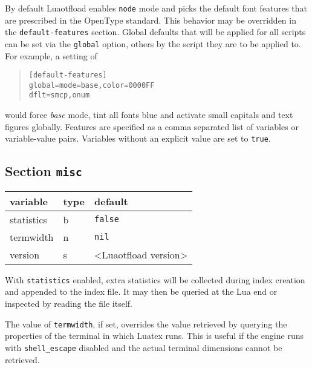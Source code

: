 \documentclass[a4paper]{article}
\newlength{\DUtablewidth} %
\begin{document}
By default Luaotfload enables \texttt{node} mode and picks the default font
features that are prescribed in the OpenType standard. This behavior
may be overridden in the \texttt{default-features} section. Global defaults
that will be applied for all scripts can be set via the \texttt{global}
option, others by the script they are to be applied to. For example,
a setting of

\begin{quote}
\begin{alltt}
[default-features]
    global = mode=base,color=0000FF
    dflt   = smcp,onum
\end{alltt}
\end{quote}

would force \emph{base} mode, tint all fonts blue and activate small
capitals and text figures globally. Features are specified as a comma
separated list of variables or variable-value pairs. Variables without
an explicit value are set to \texttt{true}.


\subsection{Section \texttt{misc}%
  \label{section-misc}%
}

\setlength{\DUtablewidth}{\linewidth}
\begin{longtable*}[c]{|p{0.191\DUtablewidth}|p{0.110\DUtablewidth}|p{0.307\DUtablewidth}|}
\hline

variable
 & 
type
 & 
default
 \\
\hline

statistics
 & 
b
 & 
\texttt{false}
 \\
\hline

termwidth
 & 
n
 & 
\texttt{nil}
 \\
\hline

version
 & 
s
 & 
<Luaotfload version>
 \\
\hline
\end{longtable*}

With \texttt{statistics} enabled, extra statistics will be collected during
index creation and appended to the index file. It may then be queried
at the Lua end or inspected by reading the file itself.

The value of \texttt{termwidth}, if set, overrides the value retrieved by
querying the properties of the terminal in which Luatex runs. This is
useful if the engine runs with \texttt{shell\_escape} disabled and the actual
terminal dimensions cannot be retrieved.
\end{document}
